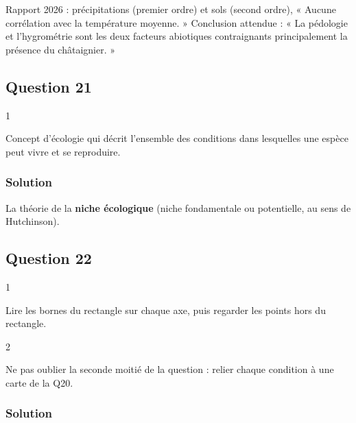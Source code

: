 \documentclass[11pt,a4paper]{article}
\begin{document}
\begin{jury}

Rapport 2026 : précipitations (premier ordre) et sols (second ordre), « Aucune corrélation avec la température moyenne. » Conclusion attendue : « La pédologie et l'hygrométrie sont les deux facteurs abiotiques contraignants principalement la présence du châtaignier. »

\end{jury}

\hypertarget{question-21}{%
\subsection{Question 21}\label{question-21}}

\begin{indication}{1}

Concept d'écologie qui décrit l'ensemble des conditions dans lesquelles une espèce peut vivre et se reproduire.

\end{indication}

\hypertarget{solution-20}{%
\subsubsection{Solution}\label{solution-20}}

La théorie de la \textbf{niche écologique} (niche fondamentale ou potentielle, au sens de Hutchinson).

\hypertarget{question-22}{%
\subsection{Question 22}\label{question-22}}

\begin{indication}{1}

Lire les bornes du rectangle sur chaque axe, puis regarder les points hors du rectangle.

\end{indication}

\begin{indication}{2}

Ne pas oublier la seconde moitié de la question : relier chaque condition à une carte de la Q20.

\end{indication}

\hypertarget{solution-21}{%
\subsubsection{Solution}\label{solution-21}}
\end{document}
